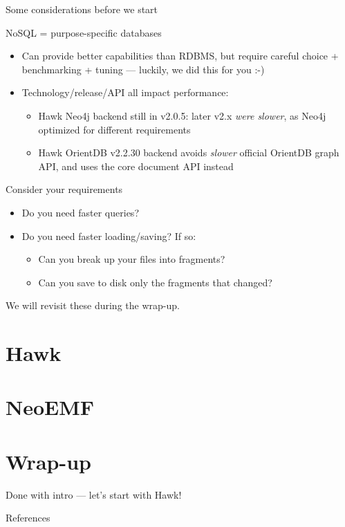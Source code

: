 \documentclass[10pt]{beamer}
\begin{document}
\begin{frame}{Some considerations before we start}

  \begin{block}{NoSQL = purpose-specific databases}
    \begin{itemize}
    \item Can provide better capabilities than RDBMS, but require careful choice
      + benchmarking + tuning --- luckily, we did this for you :-)
    \item Technology/release/API all impact performance:
      \begin{itemize}
      \item Hawk Neo4j backend still in v2.0.5: later v2.x \emph{were slower},
        as Neo4j optimized for different requirements
      \item Hawk OrientDB v2.2.30 backend avoids \emph{slower} official OrientDB
        graph API, and uses the core document API instead
      \end{itemize}
    \end{itemize}
  \end{block}

  \begin{block}{Consider your requirements}
    \begin{itemize}
    \item Do you need faster queries?
    \item Do you need faster loading/saving? If so:
      \begin{itemize}
      \item Can you break up your files into fragments?
      \item Can you save to disk only the fragments that changed?
      \end{itemize}
    \end{itemize}

    We will revisit these during the wrap-up.
  \end{block}

\end{frame}


\section{Hawk}

\section{NeoEMF}

\section{Wrap-up}

\appendix

\begin{frame}[standout]
  Done with intro --- let's start with Hawk!
\end{frame}

\begin{frame}{References}

  
  

\end{frame}
\end{document}
